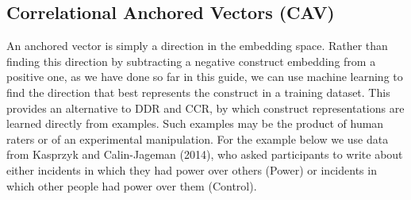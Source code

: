 \documentclass[
  man,
  floatsintext,
  longtable,
  nolmodern,
  notxfonts,
  notimes,
  colorlinks=true,linkcolor=blue,citecolor=blue,urlcolor=blue]{apa7}
\newenvironment{Shaded}{\begin{snugshade}}{\end{snugshade}}
\newcommand{\AttributeTok}[1]{\textcolor[rgb]{0.40,0.45,0.13}{#1}}
\newcommand{\CommentTok}[1]{\textcolor[rgb]{0.37,0.37,0.37}{#1}}
\newcommand{\ConstantTok}[1]{\textcolor[rgb]{0.56,0.35,0.01}{#1}}
\newcommand{\DecValTok}[1]{\textcolor[rgb]{0.68,0.00,0.00}{#1}}
\newcommand{\FunctionTok}[1]{\textcolor[rgb]{0.28,0.35,0.67}{#1}}
\newcommand{\NormalTok}[1]{\textcolor[rgb]{0.00,0.23,0.31}{#1}}
\newcommand{\OtherTok}[1]{\textcolor[rgb]{0.00,0.23,0.31}{#1}}
\newcommand{\SpecialCharTok}[1]{\textcolor[rgb]{0.37,0.37,0.37}{#1}}
\newcommand{\StringTok}[1]{\textcolor[rgb]{0.13,0.47,0.30}{#1}}
\begin{document}
\subsection{Correlational Anchored Vectors
(CAV)}\label{correlational-anchored-vectors-cav}

An anchored vector is simply a direction in the embedding space. Rather
than finding this direction by subtracting a negative construct
embedding from a positive one, as we have done so far in this guide, we
can use machine learning to find the direction that best represents the
construct in a training dataset. This provides an alternative to DDR and
CCR, by which construct representations are learned directly from
examples. Such examples may be the product of human raters or of an
experimental manipulation. For the example below we use data from
Kasprzyk and Calin-Jageman (2014), who asked participants to write about
either incidents in which they had power over others (Power) or
incidents in which other people had power over them (Control).

\begin{Shaded}
\end{Shaded}
\end{document}
